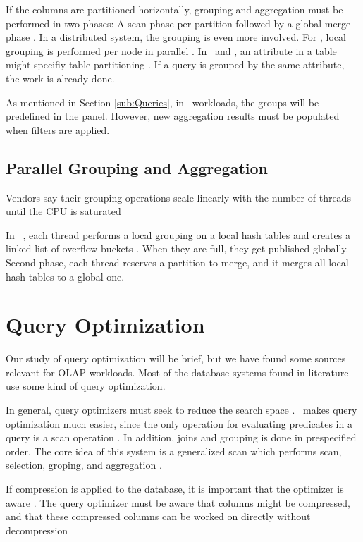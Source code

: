 If the columns are partitioned horizontally, grouping and aggregation must be performed in two phases: A scan phase per partition followed by a global merge phase \cite{Lemke2010-is}. In a distributed system, the grouping is even more involved. For \ibm, local grouping is performed per node in parallel \cite{Raman2013-em}. In \exasol~and \oracle, an attribute in a table might specifiy table partitioning \cite{Exasol2014-xh, Lahiri2015-mz}. If a query is grouped by the same attribute, the work is already done.

As mentioned in Section \ref{sub:Queries}, in \bd~workloads, the groups will be predefined in the panel. However, new aggregation results must be populated when filters are applied.

\subsection{Parallel Grouping and Aggregation}
\label{sub:Parallel Grouping and Aggregation}
Vendors say their grouping operations scale linearly with the number of threads until the CPU is saturated \cite{Farber2012-vh}

In \ibm~, each thread performs a local grouping on a local hash tables and creates a linked list of overflow buckets \cite{Raman2013-em}. When they are full, they get published globally. Second phase, each thread reserves a partition to merge, and it merges all local hash tables to a global one.

\section{Query Optimization}
\label{sec:Query Optimization}
Our study of query optimization will be brief, but we have found some sources relevant for OLAP workloads. Most of the database systems found in literature use some kind of query optimization. 

In general, query optimizers must seek to reduce the search space \cite{Boncz2002-yj, Stonebraker2005-qz}. \blink~makes query optimization much easier, since the only operation for evaluating predicates in a query is a scan operation \cite{Barber2012-xt}. In addition, joins and grouping is done in prespecified order. The core idea of this system is a generalized scan which performs scan, selection, groping, and aggregation \cite{Raman2008-gi}. 

If compression is applied to the database, it is important that the optimizer is aware \cite{Westmann200-mz}. The query optimizer must be aware that columns might be compressed, and that these compressed columns can be worked on directly without decompression \cite{Stonebraker2005-qz}

